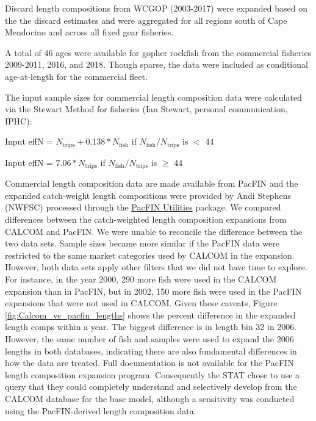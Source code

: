 \documentclass[12pt,]{article}
\begin{document}
Discard length compositions from WCGOP (2003-2017) were expanded based
on the the discard estimates and were aggregated for all regions south
of Cape Mendocino and across all fixed gear fisheries.

A total of 46 ages were available for gopher rockfish from the
commercial fisheries 2009-2011, 2016, and 2018. Though sparse, the data
were included as conditional age-at-length for the commercial fleet.

The input sample sizes for commercial length composition data were
calculated via the Stewart Method for fisheries (Ian Stewart, personal
communication, IPHC):

\begin{center}

Input effN = $N_{\text{trips}} + 0.138 * N_{\text{fish}}$ if $N_{\text{fish}}/N_{\text{trips}}$ is $<$ 44

Input effN = $7.06 * N_{\text{trips}}$ if $N_{\text{fish}}/N_{\text{trips}}$ is $\geq$ 44

\end{center}

Commercial length composition data are made available from PacFIN and
the expanded catch-weight length compositions were provided by Andi
Stephens (NWFSC) processed through the
\href{https://github.com/nwfsc-assess/PacFIN.Utilities}{PacFIN
Utilities} package. We compared differences between the catch-weighted
length composition expansions from CALCOM and PacFIN. We were unable to
reconcile the difference between the two data sets. Sample sizes became
more similar if the PacFIN data were restricted to the same market
categories used by CALCOM in the expansion. However, both data sets
apply other filters that we did not have time to explore. For instance,
in the year 2000, 290 more fish were used in the CALCOM expansion than
in PacFIN, but in 2002, 150 more fish were used in the PacFIN expansions
that were not used in CALCOM. Given these caveats, Figure
\ref{fig:Calcom_vs_pacfin_lengths} shows the percent difference in the
expanded length comps within a year. The biggest difference is in length
bin 32 in 2006. However, the same number of fish and samples were used
to expand the 2006 lengths in both databases, indicating there are also
fundamental differences in how the data are treated. Full documentation
is not available for the PacFIN length composition expansion program.
Consequently the STAT chose to use a query that they could completely
understand and selectively develop from the CALCOM database for the base
model, although a sensitivity was conducted using the PacFIN-derived
length composition data.
\end{document}
